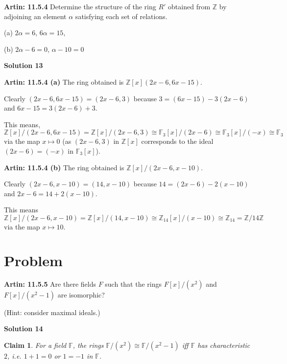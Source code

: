 \documentclass[12pt,a4paper]{article}
\newtheorem{claim}[theorem]{Claim}
\theoremstyle{definition}
\begin{document}
\begin{flushleft}
{\bf Artin: 11.5.4} Determine the structure of the ring $R'$ obtained from $\mathbb{Z}$ by adjoining an element $\alpha$ satisfying each set of relations.

(a) $2\alpha = 6$, $6\alpha = 15$,

(b) $2\alpha - 6 = 0$, $\alpha - 10 = 0$

\bigskip

{\bf Solution 13}

\medskip

{\bf Artin: 11.5.4 (a)} The ring obtained is $\mathbb{Z}[x](2x-6,6x-15)$.

Clearly $(2x-6,6x-15) = (2x-6,3)$ because $3 = (6x-15) - 3(2x-6)$ and $6x-15 = 3(2x-6) + 3$.

This means, $\mathbb{Z}[x]/(2x-6,6x-15) = \mathbb{Z}[x]/(2x-6,3) \cong \mathbb{F}_3[x]/(2x-6) \cong \mathbb{F}_3[x]/(-x) \cong \mathbb{F}_3$ via the map $x \mapsto 0$ (as $(2x-6,3)$ in $\mathbb{Z}[x]$ corresponds to the ideal $(2x-6) = (-x)$ in $\mathbb{F}_3[x]$).

\medskip

{\bf Artin: 11.5.4 (b)} The ring obtained is $\mathbb{Z}[x]/(2x-6,x-10)$.

Clearly $(2x-6,x-10) = (14,x-10)$ because $14 = (2x-6) - 2(x-10) $ and $2x-6 = 14 + 2(x-10)$.

This means $\mathbb{Z}[x]/(2x-6,x-10) = \mathbb{Z}[x]/(14,x-10) \cong \mathbb{Z}_{14}[x]/(x-10) \cong \mathbb{Z}_{14} = \mathbb{Z}/14\mathbb{Z}$ via the map $x \mapsto 10$.

\newpage

\setcounter{section}{13}
\section{Problem}

{\bf Artin: 11.5.5} Are there fields $F$ such that the rings $F[x]/(x^2)$ and $F[x]/(x^2-1)$ are isomorphic?

\medskip

(Hint: consider maximal ideals.)

\bigskip

{\bf Solution 14}

\medskip

\begin{claim}
	For a field $\mathbb{F}$, the rings $\mathbb{F}/(x^2) \cong \mathbb{F}/(x^2-1)$ iff $\mathbb{F}$ has characteristic $2$, i.e. $1 + 1 = 0$ or $1 = -1$ in $\mathbb{F}$.
\end{claim}


\end{flushleft}
\end{document}
